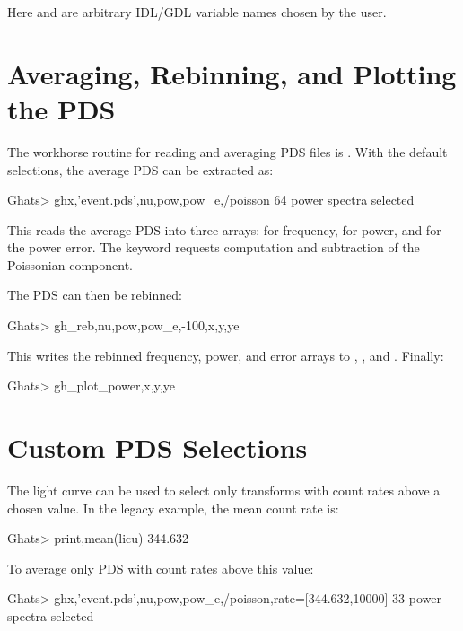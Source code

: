 Here  and  are arbitrary IDL/GDL variable names chosen
by the user.

\section{Averaging, Rebinning, and Plotting the PDS}

The workhorse routine for reading and averaging PDS files is .
With the default selections, the average PDS can be extracted as:

\begin{ghatsconsole}
Ghats> ghx,'event.pds',nu,pow,pow_e,/poisson
  64 power spectra selected
\end{ghatsconsole}

This reads the average PDS into three arrays:  for frequency,
 for power, and  for the power error. The
 keyword requests computation and subtraction of the
Poissonian component.

The PDS can then be rebinned:

\begin{ghatsconsole}
Ghats> gh_reb,nu,pow,pow_e,-100,x,y,ye
\end{ghatsconsole}

This writes the rebinned frequency, power, and error arrays to
, , and . Finally:

\begin{ghatsconsole}
Ghats> gh_plot_power,x,y,ye
\end{ghatsconsole}

\section{Custom PDS Selections}

The light curve can be used to select only transforms with count rates above a
chosen value. In the legacy example, the mean count rate is:

\begin{ghatsconsole}
Ghats> print,mean(licu)
  344.632
\end{ghatsconsole}

To average only PDS with count rates above this value:

\begin{ghatsconsole}
Ghats> ghx,'event.pds',nu,pow,pow_e,/poisson,rate=[344.632,10000]
  33 power spectra selected
\end{ghatsconsole}

